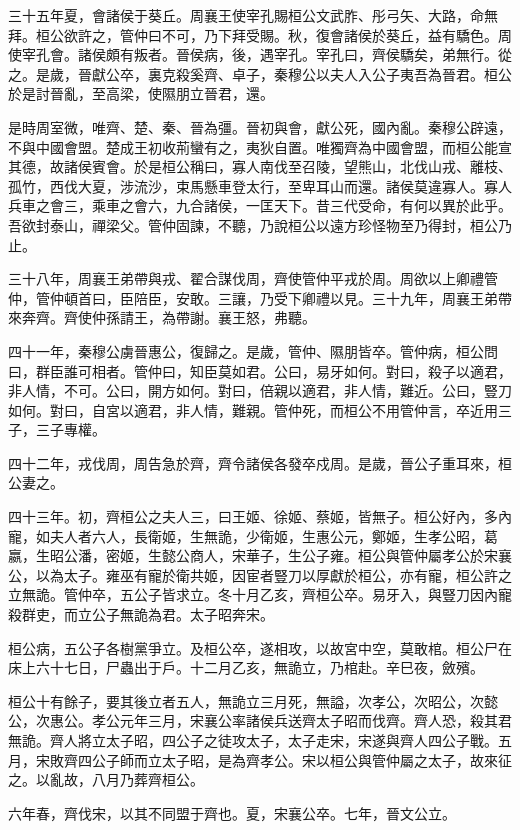三十五年夏，會諸侯于葵丘。周襄王使宰孔賜桓公文武胙、彤弓矢、大路，命無拜。桓公欲許之，管仲曰不可，乃下拜受賜。秋，復會諸侯於葵丘，益有驕色。周使宰孔會。諸侯頗有叛者。晉侯病，後，遇宰孔。宰孔曰，齊侯驕矣，弟無行。從之。是歲，晉獻公卒，裏克殺奚齊、卓子，秦穆公以夫人入公子夷吾為晉君。桓公於是討晉亂，至高梁，使隰朋立晉君，還。

是時周室微，唯齊、楚、秦、晉為彊。晉初與會，獻公死，國內亂。秦穆公辟遠，不與中國會盟。楚成王初收荊蠻有之，夷狄自置。唯獨齊為中國會盟，而桓公能宣其德，故諸侯賓會。於是桓公稱曰，寡人南伐至召陵，望熊山，北伐山戎、離枝、孤竹，西伐大夏，涉流沙，束馬懸車登太行，至卑耳山而還。諸侯莫違寡人。寡人兵車之會三，乘車之會六，九合諸侯，一匡天下。昔三代受命，有何以異於此乎。吾欲封泰山，禪梁父。管仲固諫，不聽，乃說桓公以遠方珍怪物至乃得封，桓公乃止。

三十八年，周襄王弟帶與戎、翟合謀伐周，齊使管仲平戎於周。周欲以上卿禮管仲，管仲頓首曰，臣陪臣，安敢。三讓，乃受下卿禮以見。三十九年，周襄王弟帶來奔齊。齊使仲孫請王，為帶謝。襄王怒，弗聽。

四十一年，秦穆公虜晉惠公，復歸之。是歲，管仲、隰朋皆卒。管仲病，桓公問曰，群臣誰可相者。管仲曰，知臣莫如君。公曰，易牙如何。對曰，殺子以適君，非人情，不可。公曰，開方如何。對曰，倍親以適君，非人情，難近。公曰，豎刀如何。對曰，自宮以適君，非人情，難親。管仲死，而桓公不用管仲言，卒近用三子，三子專權。

四十二年，戎伐周，周告急於齊，齊令諸侯各發卒戍周。是歲，晉公子重耳來，桓公妻之。

四十三年。初，齊桓公之夫人三，曰王姬、徐姬、蔡姬，皆無子。桓公好內，多內寵，如夫人者六人，長衛姬，生無詭，少衛姬，生惠公元，鄭姬，生孝公昭，葛嬴，生昭公潘，密姬，生懿公商人，宋華子，生公子雍。桓公與管仲屬孝公於宋襄公，以為太子。雍巫有寵於衛共姬，因宦者豎刀以厚獻於桓公，亦有寵，桓公許之立無詭。管仲卒，五公子皆求立。冬十月乙亥，齊桓公卒。易牙入，與豎刀因內寵殺群吏，而立公子無詭為君。太子昭奔宋。

桓公病，五公子各樹黨爭立。及桓公卒，遂相攻，以故宮中空，莫敢棺。桓公尸在床上六十七日，尸蟲出于戶。十二月乙亥，無詭立，乃棺赴。辛巳夜，斂殯。

桓公十有餘子，要其後立者五人，無詭立三月死，無謚，次孝公，次昭公，次懿公，次惠公。孝公元年三月，宋襄公率諸侯兵送齊太子昭而伐齊。齊人恐，殺其君無詭。齊人將立太子昭，四公子之徒攻太子，太子走宋，宋遂與齊人四公子戰。五月，宋敗齊四公子師而立太子昭，是為齊孝公。宋以桓公與管仲屬之太子，故來征之。以亂故，八月乃葬齊桓公。

六年春，齊伐宋，以其不同盟于齊也。夏，宋襄公卒。七年，晉文公立。

